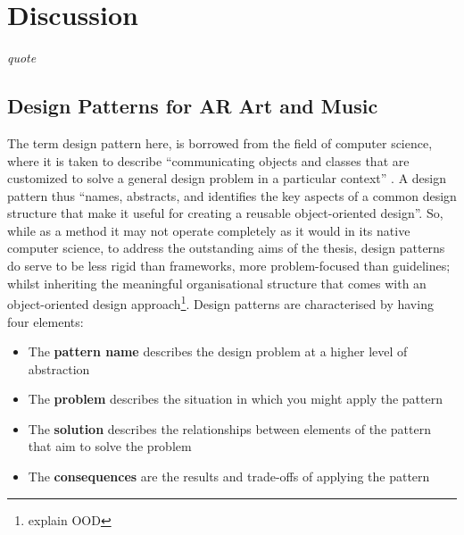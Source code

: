 % 
\chapter{Discussion}
\label{sec: discussion}
\epigraph{\emph{quote}}{\citep[]{bilbow2022}}
\section{Design Patterns for AR Art and Music} \label{sec: discussion-patterns} %

The term design pattern here, is borrowed from the field of computer science, where it is taken to describe ``communicating objects and classes that are customized to solve a general design problem in a particular context'' \citep{gamma1995}. A design pattern thus ``names, abstracts, and identifies the key aspects of a common design structure that make it useful for creating a reusable object-oriented design''. So, while as a method it may not operate completely as it would in its native computer science, to address the outstanding aims of the thesis, design patterns do serve to be less rigid than frameworks, more problem-focused than guidelines; whilst inheriting the meaningful organisational structure that comes with an object-oriented design approach\footnote{explain OOD}. Design patterns are characterised by having four elements:
\begin{itemize}
    \item The \textbf{pattern name} describes the design problem at a higher level of abstraction
    \item The \textbf{problem} describes the situation in which you might apply the pattern
    \item The \textbf{solution} describes the relationships between elements of the pattern that aim to solve the problem
    \item The \textbf{consequences} are the results and trade-offs of applying the pattern
\end{itemize}

